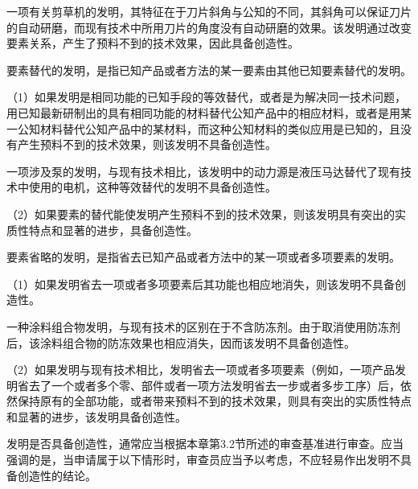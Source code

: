 {\par}

一项有关剪草机的发明，其特征在于刀片斜角与公知的不同，其斜角可以保证刀片的自动研磨，而现有技术中所用刀片的角度没有自动研磨的效果。该发明通过改变要素关系，产生了预料不到的技术效果，因此具备创造性。

要素替代的发明，是指已知产品或者方法的某一要素由其他已知要素替代的发明。

{\setlength{\parindent}{17.1bp}（1）如果发明是相同功能的已知手段的等效替代，或者是为解决同一技术问题，用已知最新研制出的具有相同功能的材料替代公知产品中的相应材料，或者是用某一公知材料替代公知产品中的某材料，而这种公知材料的类似应用是已知的，且没有产生预料不到的技术效果，则该发明不具备创造性。\par}

{\par}

一项涉及泵的发明，与现有技术相比，该发明中的动力源是液压马达替代了现有技术中使用的电机，这种等效替代的发明不具备创造性。

{\setlength{\parindent}{17.1bp}（2）如果要素的替代能使发明产生预料不到的技术效果，则该发明具有突出的实质性特点和显著的进步，具备创造性。\par}

要素省略的发明，是指省去已知产品或者方法中的某一项或者多项要素的发明。

{\setlength{\parindent}{17.1bp}（1）如果发明省去一项或者多项要素后其功能也相应地消失，则该发明不具备创造性。\par}

{\par}

一种涂料组合物发明，与现有技术的区别在于不含防冻剂。由于取消使用防冻剂后，该涂料组合物的防冻效果也相应消失，因而该发明不具备创造性。

{\setlength{\parindent}{17.1bp}（2）如果发明与现有技术相比，发明省去一项或者多项要素（例如，一项产品发明省去了一个或者多个零、部件或者一项方法发明省去一步或者多步工序）后，依然保持原有的全部功能，或者带来预料不到的技术效果，则具有突出的实质性特点和显著的进步，该发明具备创造性。\par}

发明是否具备创造性，通常应当根据本章第3.2节所述的审查基准进行审查。应当强调的是，当申请属于以下情形时，审查员应当予以考虑，不应轻易作出发明不具备创造性的结论。

